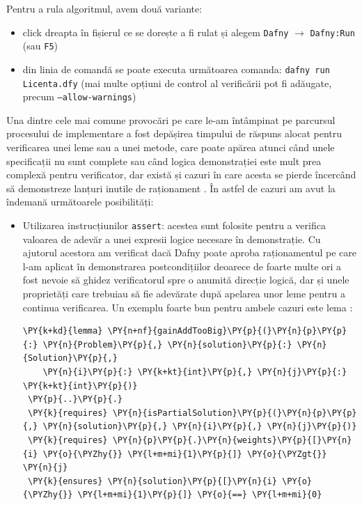 \begin{sloppypar}
 Pentru a rula algoritmul, avem două variante:
 \begin{itemize}
     \item click dreapta în fișierul ce se dorește a fi rulat și alegem \texttt{Dafny} $\rightarrow$ \texttt{Dafny:Run} (sau \texttt{F5})
     \item din linia de comandă se poate executa următoarea comanda: \texttt{dafny run Licenta.dfy} (mai multe opțiuni de control al verificării pot fi adăugate, precum \texttt{--allow-warnings})
 \end{itemize}
 \par
Una dintre cele mai comune provocări pe care le-am întâmpinat pe parcursul procesului de implementare a fost depășirea timpului de răspuns alocat pentru verificarea unei leme sau a unei metode, care poate apărea atunci când unele specificații nu sunt complete sau când logica demonstrației este mult prea complexă pentru verificator, dar există și cazuri în care acesta se pierde încercând să demonstreze lanțuri inutile de raționament \cite{verification_optimization}. În astfel de cazuri am avut la îndemană următoarele posibilități:
\begin{itemize}
    \item Utilizarea instrucțiunilor \texttt{assert}: acestea sunt folosite pentru a verifica valoarea de adevăr a unei expresii logice necesare în demonstrație. Cu ajutorul acestora am verificat dacă Dafny poate aproba raționamentul pe care l-am aplicat în demonstrarea postcondițiilor deoarece de foarte multe ori a fost nevoie să ghidez verificatorul spre o anumită direcție logică, dar și unele proprietăți care trebuiau să fie adevărate după apelarea unor leme pentru a continua verificarea. Un exemplu foarte bun pentru ambele cazuri este lema :
   \begin{Verbatim}[commandchars=\\\{\}]
\PY{k+kd}{lemma} \PY{n+nf}{gainAddTooBig}\PY{p}{(}\PY{n}{p}\PY{p}{:} \PY{n}{Problem}\PY{p}{,} \PY{n}{solution}\PY{p}{:} \PY{n}{Solution}\PY{p}{,} 
    \PY{n}{i}\PY{p}{:} \PY{k+kt}{int}\PY{p}{,} \PY{n}{j}\PY{p}{:} \PY{k+kt}{int}\PY{p}{)} 
 \PY{p}{..}\PY{p}{.}
 \PY{k}{requires} \PY{n}{isPartialSolution}\PY{p}{(}\PY{n}{p}\PY{p}{,} \PY{n}{solution}\PY{p}{,} \PY{n}{i}\PY{p}{,} \PY{n}{j}\PY{p}{)}
 \PY{k}{requires} \PY{n}{p}\PY{p}{.}\PY{n}{weights}\PY{p}{[}\PY{n}{i} \PY{o}{\PYZhy{}} \PY{l+m+mi}{1}\PY{p}{]} \PY{o}{\PYZgt{}} \PY{n}{j}
 \PY{k}{ensures} \PY{n}{solution}\PY{p}{[}\PY{n}{i} \PY{o}{\PYZhy{}} \PY{l+m+mi}{1}\PY{p}{]} \PY{o}{==} \PY{l+m+mi}{0}

\end{Verbatim}
\end{itemize}
\end{sloppypar}
